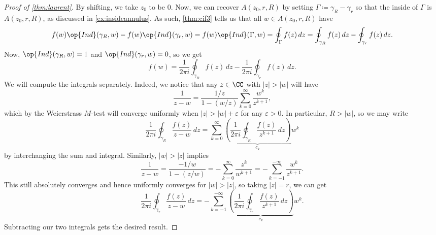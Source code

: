 \documentclass[../notes.tex]{subfiles}
\begin{document}
\begin{proof}[Proof of \autoref{thm:laurent}]
	By shifting, we take $z_0$ to be $0$. Now, we can recover $A(z_0,r,R)$ by setting $\Gamma\coloneqq\gamma_R-\gamma_r$ so that the inside of $\Gamma$ is $A(z_0,r,R)$, as discussed in \autoref{ex:insideannulus}. As such, \autoref{thm:cif3} tells us that all $w\in A(z_0,r,R)$ have
	\[f(w)\op{Ind}(\gamma_R,w)-f(w)\op{Ind}(\gamma_r,w)=f(w)\op{Ind}(\Gamma,w)=\oint_\Gamma f(z)\,dz=\oint_{\gamma_R}f(z)\,dz-\oint_{\gamma_r}f(z)\,dz.\]
	Now, $\op{Ind}(\gamma_R,w)=1$ and $\op{Ind}(\gamma_r,w)=0$, so we get
	\[f(w)=\frac1{2\pi i}\oint_{\gamma_R}f(z)\,dz-\frac1{2\pi i}\oint_{\gamma_r}f(z)\,dz.\]
	We will compute the integrals separately. Indeed, we notice that any $z\in\CC$ with $|z|>|w|$ will have
	\[\frac1{z-w}=\frac{1/z}{1-(w/z)}\sum_{k=0}^\infty\frac{w^k}{z^{k+1}},\]
	which by the Weierstrass $M$-test will converge uniformly when $|z|>|w|+\varepsilon$ for any $\varepsilon>0$. In particular, $R>|w|$, so we may write
	\[\frac1{2\pi i}\oint_{\gamma_R}\frac{f(z)}{z-w}\,dz=\sum_{k=0}^\infty\underbrace{\left(\frac1{2\pi i}\oint_{\gamma_R}\frac{f(z)}{z^{k+1}}\,dz\right)}_{c_k}w^k\]
	by interchanging the sum and integral. Similarly, $|w|>|z|$ implies
	\[\frac1{z-w}=\frac{-1/w}{1-(z/w)}=-\sum_{k=0}^\infty\frac{z^k}{w^{k+1}}=-\sum_{k=-1}^{-\infty}\frac{w^k}{z^{k+1}}.\]
	This still absolutely converges and hence uniformly converges for $|w|>|z|$, so taking $|z|=r$, we can get
	\[\frac1{2\pi i}\oint_{\gamma_r}\frac{f(z)}{z-w}\,dz=-\sum_{k=-1}^{-\infty}\underbrace{\left(\frac1{2\pi i}\oint_{\gamma_r}\frac{f(z)}{z^{k+1}}\,dz\right)}_{c_k}w^k.\]
	Subtracting our two integrals gets the desired result.
\end{proof}
\end{document}
